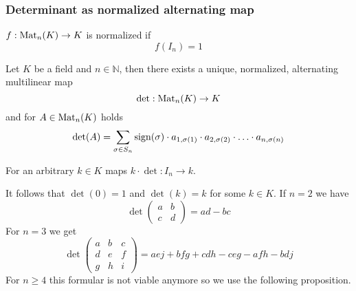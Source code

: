 \begin{figure}[h]
   \centering
   
   \qquad
   
\end{figure}

\subsubsection{Determinant as normalized alternating map}
\begin{definition}
   \(f: \operatorname{Mat}_n(K) \to K\) is normalized if
   \[f(I_n) = 1\]
\end{definition}

\begin{theorem}\label{thm:det}
   Let \(K\) be a field and \(n \in \mathbb{N}\), then there exists a unique, normalized, alternating multilinear map
   \[\det: \operatorname{Mat}_n(K) \to K\]
   and for \(A \in \operatorname{Mat}_n(K)\) holds
   \[\det(A) = \sum_{\sigma \in S_n} \operatorname{sign}(\sigma) \cdot a_{1, \sigma(1)} \cdot a_{2, \sigma(2)} \cdot \ldots \cdot a_{n, \sigma(n)}\]
\end{theorem}
\begin{remark}
   For an arbitrary \(k \in K\) maps \(k \cdot \det: I_n \to k\).
\end{remark}
\begin{remark}
   It follows that \(\det(0) = 1\) and \(\det(k) = k\) for some \(k \in K\).
   If \(n = 2\) we have
   \[\det\begin{pmatrix}a&b\\c & d\end{pmatrix} = ad - bc\]
   For \(n = 3\) we get
   \[\det\begin{pmatrix}
      a & b & c\\
      d & e & f\\
      g & h & i
   \end{pmatrix} = aej + bfg + cdh - ceg - afh - bdj\]
   For \(n \geq 4\) this formular is not viable anymore so we use the following proposition.
\end{remark}

